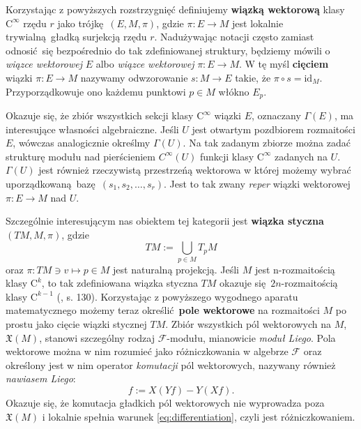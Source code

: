 Korzystając z powyższych rozstrzygnięć definiujemy \textbf{wiązką wektorową} klasy \(\mathrm{C}^\infty\) rzędu \(r\) jako trójkę \((E, M, \pi)\), gdzie \(\pi: E\to M\) jest lokalnie trywialną gładką surjekcją rzędu \(r\). Nadużywając notacji często zamiast odnosić się bezpośrednio do tak zdefiniowanej struktury, będziemy mówili o \emph{wiązce wektorowej} \(E\) albo \emph{wiązce wektorowej} \(\pi:E\to M\). W tę myśl \textbf{cięciem} wiązki \(\pi: E\to M\) nazywamy odwzorowanie \(s:M\to E\) takie, że \(\pi\circ s= \mathrm{id}_M\). Przyporządkowuje ono każdemu punktowi \(p\in M\) włókno \(E_p\). 

Okazuje się, że zbiór wszystkich sekcji klasy \(\mathrm{C}^\infty\) wiązki \(E\), oznaczany \(\Gamma(E)\), ma interesujące własności algebraiczne. Jeśli \(U\) jest otwartym pozdbiorem rozmaitości \(E\), wówczas analogicznie określmy \(\Gamma(U)\). Na tak zadanym zbiorze można zadać strukturę modułu nad pierścieniem \(C^\infty(U)\) funkcji klasy \(\mathrm{C}^\infty\) zadanych na \(U\). \(\Gamma(U)\) jest również rzeczywistą przestrzeńą wektorowa w której możemy wybrać uporządkowaną bazę \((s_1, s_2, \dots, s_r)\). Jest to tak zwany \emph{reper} wiązki wektorowej \(\pi:E\to M\) nad \(U\). 

Szczególnie interesującym nas obiektem tej kategorii jest \textbf{wiązka styczna} \((TM, M, \pi)\), gdzie 
\begin{equation*}
TM := \bigcup\limits_{p\in M} T_p M
\end{equation*}
oraz \(\pi: TM \ni v \mapsto p\in M\) jest naturalną projekcją. 
Jeśli \(M\) jest n-rozmaitością klasy \(\mathrm{C}^k\), to tak zdefiniowana wiązka styczna \(TM\) okazuje się \(2n\)-rozmaitością klasy \(\mathrm{C}^{k-1}\) (\cite{tu}, s. 130). 
Korzystając z powyższego wygodnego aparatu matematycznego możemy teraz określić \textbf{pole wektorowe} na rozmaitości \(M\) po prostu jako cięcie wiązki stycznej \(TM\). Zbiór wszystkich pól wektorowych na \(M\), \(\mathfrak{X}(M)\), stanowi szczególny rodzaj \(\mathcal{F}\)-modułu, mianowicie \emph{moduł Liego}. Pola wektorowe można w nim rozumieć jako różniczkowania w algebrze \(\mathcal{F}\) oraz określony jest w nim operator \emph{komutacji} pól wektorowych, nazywany również \emph{nawiasem Liego}:
\begin{equation*}
    [X, Y]f := X(Yf) - Y(Xf).
\end{equation*}
Okazuje się, że komutacja gładkich pól wektorowych nie wyprowadza poza \(\mathfrak{X}(M)\) i lokalnie spełnia warunek \eqref{eq:differentiation}, czyli jest różniczkowaniem.


